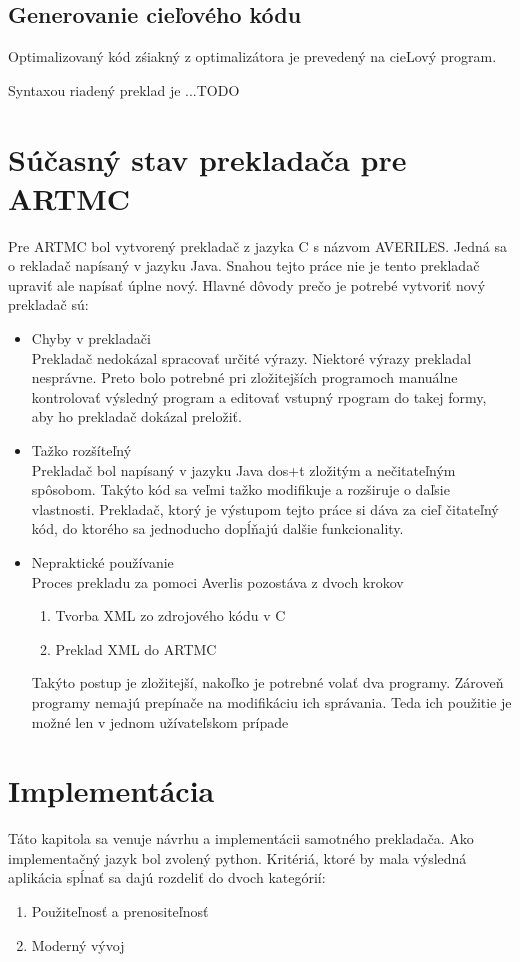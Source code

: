 \section{Generovanie cieľového kódu}
Optimalizovaný kód zśiakný z optimalizátora je prevedený na cieLový program.

Syntaxou riadený preklad je ...TODO

\chapter{Súčasný stav prekladača pre ARTMC}
Pre ARTMC bol vytvorený prekladač z jazyka C s názvom AVERILES. Jedná sa o
rekladač napísaný v jazyku Java. Snahou tejto práce nie je tento prekladač
upraviť ale napísať úplne nový. Hlavné dôvody prečo je potrebé vytvoriť nový
prekladač sú:
\begin{itemize}
    \item Chyby v prekladači\\
        Prekladač nedokázal spracovať určité výrazy. Niektoré výrazy prekladal nesprávne.
        Preto bolo potrebné pri zložitejších programoch manuálne kontrolovať výsledný
        program a editovať vstupný rpogram do takej formy, aby ho prekladač dokázal
        preložiť.
    \item Tažko rozšíteľný\\
        Prekladač bol napísaný v jazyku Java dos+t zložitým a nečitateľným spôsobom. Takýto
        kód sa veľmi tažko modifikuje a rozširuje o daľsie vlastnosti. Prekladač,
        ktorý je výstupom tejto práce si dáva za cieľ čitateľný kód, do ktorého
        sa jednoducho dopĺňajú dalšie funkcionality.
    \item Nepraktické používanie\\
        Proces prekladu za pomoci Averlis pozostáva z dvoch krokov
        \begin{enumerate}
            \item Tvorba XML zo zdrojového kódu v C
            \item Preklad XML do ARTMC
        \end{enumerate}
        Takýto postup je zložitejší, nakoľko je potrebné volať dva programy.
        Zároveň programy nemajú prepínače na modifikáciu ich správania. Teda
        ich použitie je možné len v jednom užívateľskom prípade
\end{itemize}


\chapter{Implementácia}
Táto kapitola sa venuje návrhu a implementácii samotného prekladača.
Ako implementačný jazyk bol zvolený python. Kritériá, ktoré by mala výsledná
aplikácia spĺnať sa dajú rozdeliť do dvoch kategórií:
\begin{enumerate}
    \item Použiteľnosť a prenositeľnosť
    \item Moderný vývoj
\end{enumerate}

